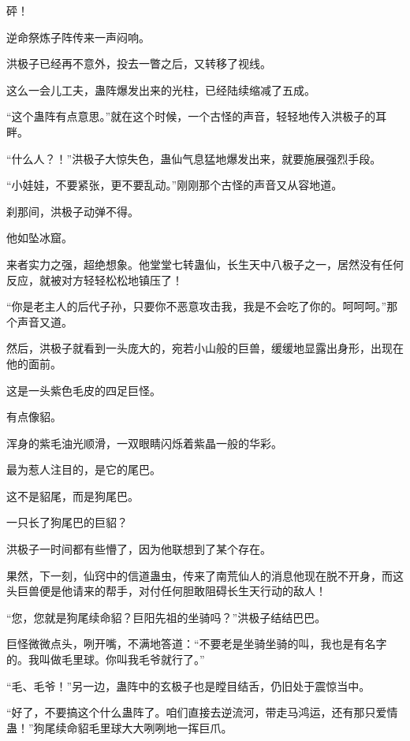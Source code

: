 
\begin{this_body}

砰！

逆命祭炼子阵传来一声闷响。

洪极子已经再不意外，投去一瞥之后，又转移了视线。

这么一会儿工夫，蛊阵爆发出来的光柱，已经陆续缩减了五成。

“这个蛊阵有点意思。”就在这个时候，一个古怪的声音，轻轻地传入洪极子的耳畔。

“什么人？！”洪极子大惊失色，蛊仙气息猛地爆发出来，就要施展强烈手段。

“小娃娃，不要紧张，更不要乱动。”刚刚那个古怪的声音又从容地道。

刹那间，洪极子动弹不得。

他如坠冰窟。

来者实力之强，超绝想象。他堂堂七转蛊仙，长生天中八极子之一，居然没有任何反应，就被对方轻轻松松地镇压了！

“你是老主人的后代子孙，只要你不恶意攻击我，我是不会吃了你的。呵呵呵。”那个声音又道。

然后，洪极子就看到一头庞大的，宛若小山般的巨兽，缓缓地显露出身形，出现在他的面前。

这是一头紫色毛皮的四足巨怪。

有点像貂。

浑身的紫毛油光顺滑，一双眼睛闪烁着紫晶一般的华彩。

最为惹人注目的，是它的尾巴。

这不是貂尾，而是狗尾巴。

一只长了狗尾巴的巨貂？

洪极子一时间都有些懵了，因为他联想到了某个存在。

果然，下一刻，仙窍中的信道蛊虫，传来了南荒仙人的消息他现在脱不开身，而这头巨兽便是他请来的帮手，对付任何胆敢阻碍长生天行动的敌人！

“您，您就是狗尾续命貂？巨阳先祖的坐骑吗？”洪极子结结巴巴。

巨怪微微点头，咧开嘴，不满地答道：“不要老是坐骑坐骑的叫，我也是有名字的。我叫做毛里球。你叫我毛爷就行了。”

“毛、毛爷！”另一边，蛊阵中的玄极子也是瞠目结舌，仍旧处于震惊当中。

“好了，不要搞这个什么蛊阵了。咱们直接去逆流河，带走马鸿运，还有那只爱情蛊！”狗尾续命貂毛里球大大咧咧地一挥巨爪。


\end{this_body}
